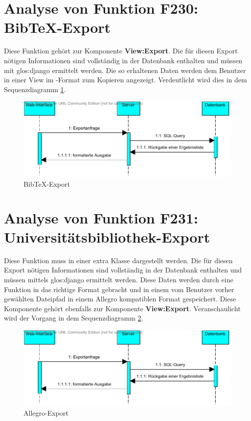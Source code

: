 \section{Analyse von Funktion F230: Bib\TeX -Export}
Diese Funktion gehört zur Komponente \textbf{View:Export}. Die für diesen Export nötigen Informationen sind vollständig in der Datenbank enthalten und müssen mit \gls{glos:django} ermittelt werden. Die so erhaltenen Daten werden dem Benutzer in einer View im \BibTeX -Format zum Kopieren angezeigt. Verdeutlicht wird dies in dem Sequenzdiagramm \ref{fig:BibTeX-Export}.

\begin{figure}[H]
\includegraphics[width=0.8\linewidth]{bilder/Seq-BibTex.pdf}
\caption[BibTeX-Export]{BibTeX-Export}
\label{fig:BibTeX-Export}
\end{figure}

\section{Analyse von Funktion F231: Universitätsbibliothek-Export}

Diese Funktion muss in einer extra Klasse dargestellt werden. Die für diesen
Export nötigen Informationen sind vollständig in der Datenbank enthalten und
müssen mittels \gls{glos:django} ermittelt werden. Diese Daten
werden durch eine Funktion in das richtige Format gebracht und in einem vom
Benutzer vorher gewählten Dateipfad in einem Allegro kompatiblen Format
gespeichert. Diese Komponente gehört ebenfalls zur Komponente
\textbf{View:Export}. Veranschaulicht wird der Vorgang in dem Sequenzdiagramm
\ref{fig:Allegro-Export}.

\begin{figure}[H]
\includegraphics[width=0.8\linewidth]{bilder/Seq-BibTex.pdf}
\caption[Allegro-Export]{Allegro-Export}
\label{fig:Allegro-Export}
\end{figure}

